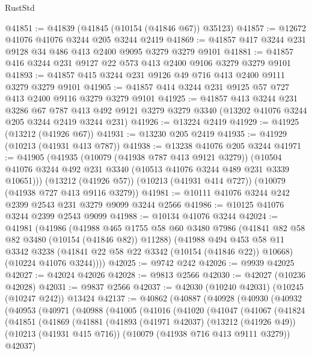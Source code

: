 \begin{lexlean}{RustStd}
\begin{coremodule}
@41851 := @41839 (@41845 (@10154 (@41846 @67)) @35123)
@41857 := @12672 @41076 @41076 @3244 @205 @3244 @2419
@41869 := @41857 @417 @3244 @231 @9128 @34 @486 @413 @2400 @9095 @3279 @3279 @9101
@41881 := @41857 @416 @3244 @231 @9127 @22 @573 @413 @2400 @9106 @3279 @3279 @9101
@41893 := @41857 @415 @3244 @231 @9126 @49 @716 @413 @2400 @9111 @3279 @3279 @9101
@41905 := @41857 @414 @3244 @231 @9125 @57 @727 @413 @2400 @9116 @3279 @3279 @9101
@41925 := @41857
    @413
    @3244
    @231
    @3286
    @67
    @787
    @413
    @492
    @9121
    @3279
    @3279
    @3340
    (@13202 @41076 @3244 @205 @3244 @2419 @3244 @231)
@41926 := @13224 @2419
@41929 := @41925 (@13212 (@41926 @67))
@41931 := @13230 @205 @2419
@41935 := @41929 (@10213 (@41931 @413 @787))
@41938 := @13238 @41076 @205 @3244
@41971 := @41905
    (@41935
      (@10079 (@41938 @787 @413 @9121 @3279))
      (@10504 @41076 @3244 @492 @231 @3340 (@10513 @41076 @3244 @489 @231 @3339 @10651)))
    (@13212 (@41926 @57))
    (@10213 (@41931 @414 @727))
    (@10079 (@41938 @727 @413 @9116 @3279))
@41981 := @10111 @41076 @3244 @242 @2399 @2543 @231 @3279 @9099 @3244 @2566
@41986 := @10125 @41076 @3244 @2399 @2543 @9099
@41988 := @10134 @41076 @3244
@42024 := @41981
    (@41986
      (@41988
        @465
        @1755
        @58
        @60
        @3480
        @7986
        (@41841 @82 @58 @82 @3480 (@10154 (@41846 @82)) @11288)
        (@41988
          @494
          @453
          @58
          @11
          @3342
          @3238
          (@41841 @22 @58 @22 @3342 (@10154 (@41846 @22)) @10668)
          (@10224 @41076 @3244))))
@42025 := @9742 @242
@42026 := @9939 @42025
@42027 := @42024 @42026
@42028 := @9813 @2566
@42030 := @42027 (@10236 @42028)
@42031 := @9837 @2566
@42037 := @42030 (@10240 @42031) (@10245 (@10247 @242)) @13424
@42137 := @40862
    (@40887
      (@40928
        (@40930
          (@40932
            (@40953
              (@40971
                (@40988
                  (@41005
                    (@41016
                      (@41020
                        (@41047
                          (@41067
                            (@41824
                              (@41851
                                (@41869
                                  (@41881
                                    (@41893
                                      (@41971 @42037)
                                      (@13212 (@41926 @49))
                                      (@10213 (@41931 @415 @716))
                                      (@10079 (@41938 @716 @413 @9111 @3279))
                                      @42037)

\end{coremodule}
\end{lexlean}
